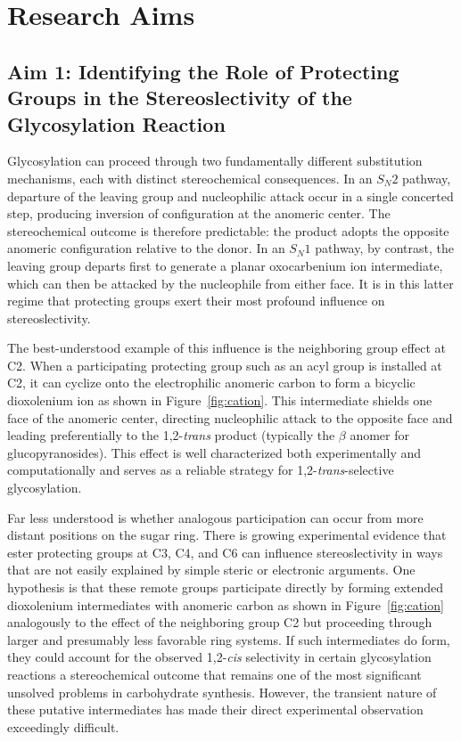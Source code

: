 \documentclass{article}
\begin{document}
\section{Research Aims}
\subsection{Aim 1: Identifying the Role of Protecting Groups in the Stereoslectivity of the Glycosylation Reaction}

Glycosylation can proceed through two fundamentally different substitution mechanisms, each with distinct stereochemical consequences. In an $S_N2$ pathway, departure of the leaving group and nucleophilic attack occur in a single concerted step, producing inversion of configuration at the anomeric center. The stereochemical outcome is therefore predictable: the product adopts the opposite anomeric configuration relative to the donor. In an $S_N1$ pathway, by contrast, the leaving group departs first to generate a planar oxocarbenium ion intermediate, which can then be attacked by the nucleophile from either face. It is in this latter regime that protecting groups exert their most profound influence on stereoslectivity.

The best-understood example of this influence is the neighboring group effect at C2. When a participating protecting group such as an acyl group is installed at C2, it can cyclize onto the electrophilic anomeric carbon to form a bicyclic dioxolenium ion as shown in Figure~\ref{fig:cation}. This intermediate shields one face of the anomeric center, directing nucleophilic attack to the opposite face and leading preferentially to the 1,2-\textit{trans} product (typically the $\beta$ anomer for glucopyranosides). This effect is well characterized both experimentally and computationally and serves as a reliable strategy for 1,2-\textit{trans}-selective glycosylation.

Far less understood is whether analogous participation can occur from more distant positions on the sugar ring. There is growing experimental evidence that ester protecting groups at C3, C4, and C6 can influence stereoslectivity in ways that are not easily explained by simple steric or electronic arguments. One hypothesis is that these remote groups participate directly by forming extended dioxolenium intermediates with anomeric carbon as shown in Figure~\ref{fig:cation} analogously to the effect of the neighboring group C2 but proceeding through larger and presumably less favorable ring systems. If such intermediates do form, they could account for the observed 1,2-\textit{cis} selectivity in certain glycosylation reactions a stereochemical outcome that remains one of the most significant unsolved problems in carbohydrate synthesis. 
\newpage
However, the transient nature of these putative intermediates has made their direct experimental observation exceedingly difficult.
\end{document}
